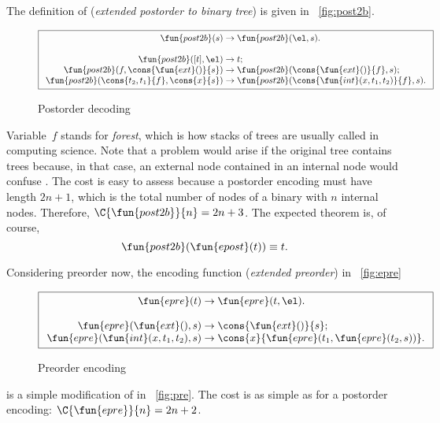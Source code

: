 The definition of 
(\emph{extended postorder to binary tree}) is given in
\fig~\vref{fig:post2b}.
\begin{figure}[b]
\begin{equation*}
\boxed{
\begin{array}{r@{\;}c@{\;}l}
\fun{post2b}(s) & \rightarrow & \fun{post2b}(\el,s).\\
\\
\fun{post2b}([t],\el) & \rightarrow & t;\\
\fun{post2b}(f,\cons{\fun{ext}()}{s}) & \rightarrow & \fun{post2b}(\cons{\fun{ext}()}{f},s);\\
\fun{post2b}(\cons{t_2,t_1}{f},\cons{x}{s}) & \rightarrow & \fun{post2b}(\cons{\fun{int}(x,t_1,t_2)}{f},s).
\end{array}}
\end{equation*}
\caption{Postorder decoding}
\label{fig:post2b}
\end{figure}
Variable~\(f\) stands for \emph{forest}, which is
how stacks of trees are usually called in computing science. Note that
a problem would arise if the original tree contains trees because, in
that case, an external node contained in an internal node would
confuse . The cost is easy
to assess because a postorder encoding must have length \(2n+1\),
which is the total number of nodes of a binary with \(n\) internal
nodes. Therefore, \(\C{\fun{post2b}}{n} = 2n +
3\). The expected theorem is, of
course,
\begin{equation}
\fun{post2b}(\fun{epost}(t)) \equiv t.
\label{thm:post2b_epost}
\end{equation}

Considering preorder now, the encoding function
(\emph{extended preorder}) in \fig~\vref{fig:epre}
\begin{figure}
\begin{equation*}
\boxed{
\begin{array}{r@{\;}c@{\;}l}
\fun{epre}(t) & \rightarrow & \fun{epre}(t,\el).\\
\\
\fun{epre}(\fun{ext}(),s) & \rightarrow
  & \cons{\fun{ext}()}{s};\\
\fun{epre}(\fun{int}(x,t_1,t_2),s) & \rightarrow
  & \cons{x}{\fun{epre}(t_1,\fun{epre}(t_2,s))}.
\end{array}}
\end{equation*}
\caption{Preorder encoding}
\label{fig:epre}
\end{figure}
is a simple modification of  in
\fig~\vref{fig:pre}. The cost is as simple as for a postorder
encoding: \(\C{\fun{epre}}{n} =
2n+2\).


